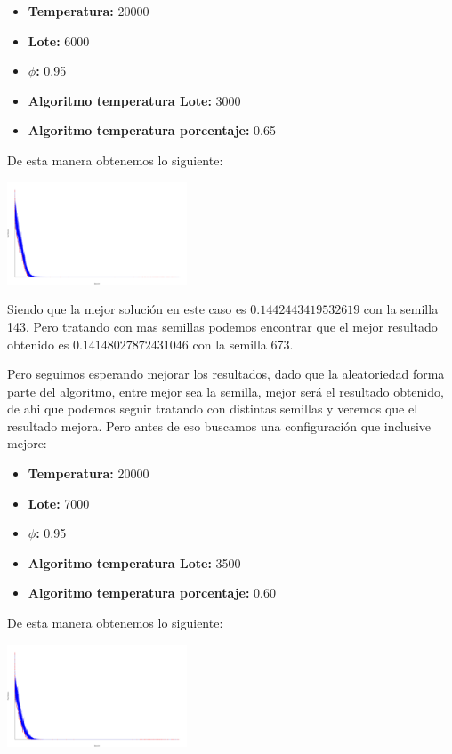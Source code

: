 \begin{multicols}{2}
\begin{itemize}
\item \textbf{Temperatura:} 20000
\item \textbf{Lote: } 6000
\item \textbf{$\phi$: } 0.95
\item \textbf{Algoritmo temperatura Lote: } 3000
\item \textbf{Algoritmo temperatura porcentaje: } 0.65
\end{itemize}

De esta manera obtenemos lo siguiente:

\begin{center}
    \includegraphics[width=0.4\textwidth]{../svgs/150_documentable_semilla_673.pdf}
\end{center}


Siendo que la mejor solución en este caso es $0.1442443419532619$ con la semilla 143. Pero tratando con mas semillas podemos encontrar que el mejor resultado obtenido es $0.14148027872431046$ con la semilla 673.

Pero seguimos esperando mejorar los resultados, dado que la aleatoriedad forma parte del algoritmo, entre mejor sea la semilla, mejor será el resultado obtenido, de ahi que podemos seguir tratando con distintas semillas y veremos que el resultado mejora. Pero antes de eso buscamos una configuración que inclusive mejore:

\begin{itemize}
\item \textbf{Temperatura:} 20000
\item \textbf{Lote: } 7000
\item \textbf{$\phi$: } 0.95
\item \textbf{Algoritmo temperatura Lote: } 3500
\item \textbf{Algoritmo temperatura porcentaje: } 0.60
\end{itemize}

De esta manera obtenemos lo siguiente:

\begin{center}
    \includegraphics[width=0.4\textwidth]{../svgs/150_documentable_semilla_118.pdf}
\end{center}


\end{multicols}
